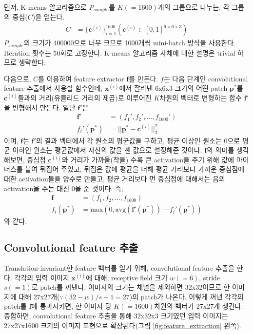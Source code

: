 \documentclass[a4paper,9pt]{article}
\begin{document}
\begin{multicols*}{2}
먼저, K-means 알고리즘으로 $P_{sample}$를 $K(=1600)$개의 그룹으로 나누는, 각 그룹의 중심($C$)을 얻는다.
\begin{align*}
    C &= \{ \mathbf{c}^{(i)} \}_{i=1}^{1600} ( \mathbf{c}^{(i)} \in [0, 1]^{6 \times 6 \times 3} )
\end{align*}
$P_{sample}$의 크기가 400000으로 너무 크므로 1000개씩 mini-batch 방식을 사용한다.
Iteration 횟수는 50회로 고정한다.
K-means 알고리즘 자체에 대한 설명은 trivial 하므로 생략한다.

다음으로, $C$를 이용하여 feature extractor $\mathbf{f}$를 만든다.
$f$는 다음 단계인 convolutional feature 추출에서 사용할 함수인데, $\mathbf{x}^{(i)}$에서 잘라낸 6x6x3 크기의 어떤 patch $\mathbf{p}^{*}$를 $\mathbf{c}^{(i)}$들과의 거리(유클리드 거리의 제곱)로 이루어진 $K$차원의 벡터로 변형하는 함수 $\mathbf{f}'$을 변형해서 만든다.
일단 $\mathbf{f}'$은
\begin{align*}
    \mathbf{f}' &= (f_{1}', f_{2}', ..., f_{1600}') \\
    f_{i}'(\mathbf{p}^{*}) &= || \mathbf{p}^{*} - \mathbf{c}^{(i)} ||_2^2
\end{align*}
이며, $\mathbf{f}$는 $\mathbf{f}'$의 결과 벡터에서 각 원소의 평균값을 구하고, 평균 이상인 원소는 0으로 평균 이하인 원소는 평균값에서 자신의 값을 뺀 값으로 설정해준 것이다.
$\mathbf{f}$의 의미를 생각해보면, 중심점 $\mathbf{c}^{(i)}$와 거리가 가까울(작을) 수록 큰 activation을 주기 위해 값에 마이너스를 붙여 뒤집어 주었고, 뒤집은 값에 평균을 더해 평균 거리보다 가까운 중심점에 대한 activation들을 양수로 만들고, 평균 거리보다 먼 중심점에 대해서는 음의 activation을 주는 대신 0을 준 것이다.
즉,
\begin{align*}
    \mathbf{f} &= (f_{1}, f_{2}, ..., f_{1600}) \\
    f_{i}(\mathbf{p}^{*}) &= \text{max} ( 0, \text{avg} (\mathbf{f}'(\mathbf{p}^{*})) - f_{i}'(\mathbf{p}^{*}) )
\end{align*}
와 같다.

\subsection{Convolutional feature 추출}

Translation-invariant한 feature 벡터를 얻기 위해, convolutional feature 추출을 한다.
각각의 입력 이미지 $\mathbf{x}^{(i)}$에 대해, receptive field 크기 $w(=6)$, stride $s(=1)$로 patch를 꺼낸다.
이미지의 크기는 채널을 제외하면 32x32이므로 한 이미지에 대해 27x27개($\because (32-w)/s+1=27$)의 patch가 나온다.
이렇게 꺼낸 각각의 patch를 $\mathbf{f}$에 통과시키면, 한 이미지 당 $K(=1600)$차원의 벡터가 27x27개 생긴다.
종합하면, convolutional feature 추출을 통해 32x32x3 크기였던 입력 이미지는 27x27x1600 크기의 이미지 표현으로 확장된다(그림 \ref{fig:feature_extraction} 왼쪽).


\end{multicols*}
\end{document}
